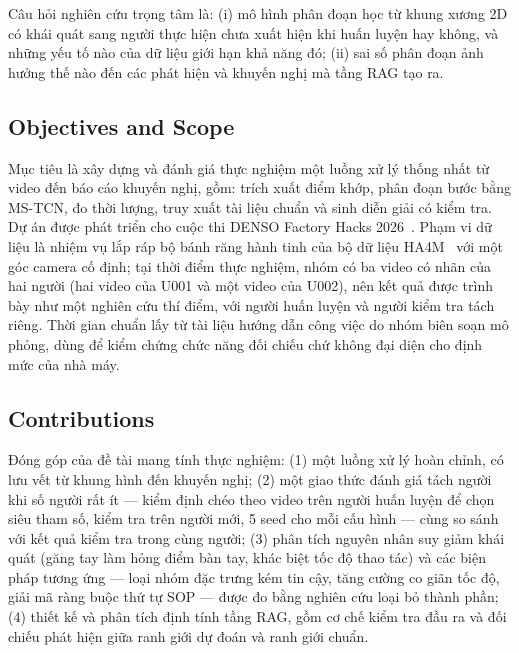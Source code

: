 Câu hỏi nghiên cứu trọng tâm là: (i) mô hình phân đoạn học từ khung xương 2D có khái quát sang người thực hiện chưa xuất hiện khi huấn luyện hay không, và những yếu tố nào của dữ liệu giới hạn khả năng đó; (ii) sai số phân đoạn ảnh hưởng thế nào đến các phát hiện và khuyến nghị mà tầng RAG tạo ra.

\subsection{Objectives and Scope}

Mục tiêu là xây dựng và đánh giá thực nghiệm một luồng xử lý thống nhất từ video đến báo cáo khuyến nghị, gồm: trích xuất điểm khớp, phân đoạn bước bằng MS-TCN, đo thời lượng, truy xuất tài liệu chuẩn và sinh diễn giải có kiểm tra. Dự án được phát triển cho cuộc thi DENSO Factory Hacks 2026~\citep{denso}. Phạm vi dữ liệu là nhiệm vụ lắp ráp bộ bánh răng hành tinh của bộ dữ liệu HA4M~\citep{ha4m} với một góc camera cố định; tại thời điểm thực nghiệm, nhóm có ba video có nhãn của hai người (hai video của U001 và một video của U002), nên kết quả được trình bày như một nghiên cứu thí điểm, với người huấn luyện và người kiểm tra tách riêng. Thời gian chuẩn lấy từ tài liệu hướng dẫn công việc do nhóm biên soạn mô phỏng, dùng để kiểm chứng chức năng đối chiếu chứ không đại diện cho định mức của nhà máy.

\subsection{Contributions}

Đóng góp của đề tài mang tính thực nghiệm: (1) một luồng xử lý hoàn chỉnh, có lưu vết từ khung hình đến khuyến nghị; (2) một giao thức đánh giá tách người khi số người rất ít — kiểm định chéo theo video trên người huấn luyện để chọn siêu tham số, kiểm tra trên người mới, 5 seed cho mỗi cấu hình — cùng so sánh với kết quả kiểm tra trong cùng người; (3) phân tích nguyên nhân suy giảm khái quát (găng tay làm hỏng điểm bàn tay, khác biệt tốc độ thao tác) và các biện pháp tương ứng — loại nhóm đặc trưng kém tin cậy, tăng cường co giãn tốc độ, giải mã ràng buộc thứ tự SOP — được đo bằng nghiên cứu loại bỏ thành phần; (4) thiết kế và phân tích định tính tầng RAG, gồm cơ chế kiểm tra đầu ra và đối chiếu phát hiện giữa ranh giới dự đoán và ranh giới chuẩn.
